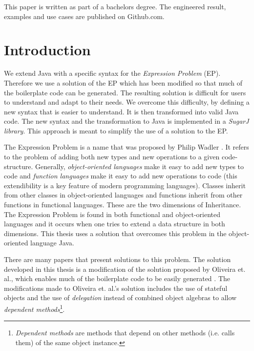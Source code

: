 \documentclass{report}
\begin{document}
This paper is written as part of a bachelors degree. The engineered result, examples and use cases are published on Github.com\cite{Peuscher-GitHub-EP-2014}.%



\chapter*{Introduction}

We extend Java with a specific syntax for the \emph{Expression Problem} (EP). Therefore we use a solution of the EP which has been modified so that much of the boilerplate code can be generated. The resulting solution is difficult for users to understand and adapt to their needs. We overcome this difficulty, by defining a new syntax that is easier to understand. It is then transformed into valid Java code. The new syntax and the transformation to Java is implemented in a \emph{SugarJ library}. This approach is meant to simplify the use of a solution to the EP.

The Expression Problem is a name that was proposed by Philip Wadler \cite{Wadler-Expression-1998}. It refers to the problem of adding both new types and new operations to a given code-structure. Generally, \emph{object-oriented languages} make it easy to add new types to code and \emph{function languages} make it easy to add new operations to code (this extendibility is a key feature of modern programming languages). Classes inherit from other classes in object-oriented languages and functions inherit from other functions in functional languages. These are the two dimensions of Inheritance. The Expression Problem is found in both functional and object-oriented languages and it occurs when one tries to extend a data structure in both dimensions. This thesis uses a solution that overcomes this problem in the object-oriented language Java.

There are many papers that present solutions to this problem. The solution developed in this thesis is a modification of the solution proposed by Oliveira et. al., which enables much of the boilerplate code to be  easily generated \cite{Oliv-Extensibility-2012}. The modifications made to Oliveira et. al.'s solution includes the use of stateful objects and the use of \emph{delegation} instead of combined object algebras to allow \emph{dependent methods}\footnote{\emph{Dependent methods} are methods that depend on other methods (i.e. calls them) of the same object instance.}.
\end{document}
